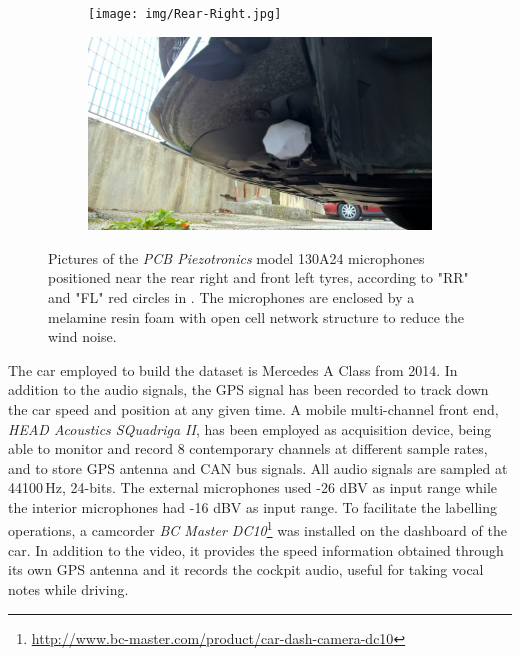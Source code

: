 \begin{figure}[t]
	\centering
	\begin{subfigure}[b]{0.48\textwidth}
		\texttt{[image: img/Rear-Right.jpg]}
	\end{subfigure}
	\hfil
	\begin{subfigure}[b]{0.48\textwidth}
		\includegraphics[width=\textwidth]{img/Front-Left.jpg}
	\end{subfigure}
	
	
	\caption[\textit{PCB Piezotronics} model 130A24 microphones]{Pictures of the \textit{PCB Piezotronics} model 130A24 microphones positioned near the rear right and front left tyres, according to "RR" and "FL" red circles in . The microphones are enclosed by a melamine resin foam with open cell network structure to reduce the wind noise.}
	\label{fig:car-rr-and-fl}
\end{figure}



The car employed to build the dataset is Mercedes A Class from 2014. In addition to the audio signals, the GPS signal has been recorded to track down the car speed and position at any given time. A mobile multi-channel front end, \textit{HEAD Acoustics SQuadriga II}, has been employed as acquisition device, being able to monitor and record 8 contemporary channels at different sample rates, and to store GPS antenna and CAN bus signals.
All audio signals are sampled at 44100\,Hz, 24-bits. The external microphones used -26 dBV as input range while the interior microphones had -16 dBV as input range.
To facilitate the labelling operations, a camcorder \textit{BC Master DC10}\footnote{\url{http://www.bc-master.com/product/car-dash-camera-dc10}} was installed on the dashboard of the car. In addition to the video, it provides the speed information obtained through its own GPS antenna and it records the cockpit audio, useful for taking vocal notes while driving.

